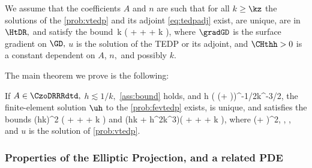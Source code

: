 \label{ass:bound}
We assume that the coefficients $A$ and $n$ are such that for all $k \geq \kz$ the solutions of the \cref{prob:vtedp} and its adjoint \eqref{eq:tedpadj} exist, are unique, are in $\HtDR,$ and satisfy the bound
\beq\label{eq:hhbound}
 \lesssim \CHthh \,k \mleft( +  + \NLtGD{\gradGD \gD} + k \NLtGD{\gD}\mright),
\eeq
where $\gradGD$ is the surface gradient on $\GD,$ $u$ is the solution of the TEDP or its adjoint, and $\CHthh >0$ is a constant dependent on $A$, $n,$ and possibly $k.$
 \eas


The main theorem we prove is the following:

\label{thm:febound}
If $A \in \CzoDRRRdtd,$ $h \lesssim 1/k,$ \cref{ass:bound} holds, and
\beq\label{eq:hcond}
h \lesssim \mleft( \mleft(\Amax + \half\mright)\CHtell \CHthh\mright)^{-1/2}k^{-3/2}, %
\eeq
the finite-element solution $\uh$ to the \cref{prob:fevtedp} exists, is unique, and satisfies the bounds
\beq\label{eq:hherrltbound}
 \lesssim \Cfemo \mleft(hk\mright)^2 \mleft( + \Nunsure{\gI} + \NLtGD{\gradGD \gD} + k \NLtGD{\gD}\mright)
\eeq
and
\beq\label{eq:hherrwbound}
 \lesssim \mleft(\Cfemt hk +  \Cfemth h^2k^3\mright)\mleft( + \Nunsure{\gI} + \NLtGD{\gradGD \gD} + k \NLtGD{\gD}\mright),
\eeq
where
\beqs
\Cfemo \de \mleft(\Amax + \half\mright)\CHthh^2,
\eeqs
\beqs
\Cfemt \de \frac{\Amax+\half}{\Amin} \CHthh,
\eeqs
\beqs
\Cfemth \de {}\Cfemo,
\eeqs
and $u$ is the solution of \cref{prob:vtedp}.
\enth

\subsubsection{Properties of the Elliptic Projection, and a related PDE}

